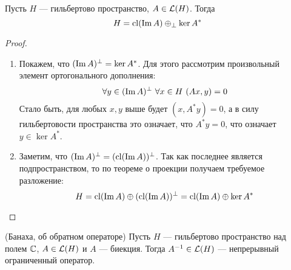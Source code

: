 \begin{theorem} \label{conj_decomp_th}
	Пусть $H$ --- гильбертово пространство, $A \in \mathcal{L}(H)$. Тогда
	\[
		H = \operatorname{cl}(\operatorname{Im} A) \oplus_\bot \ker A^*
	\]
\end{theorem}

\begin{proof}~
	\begin{enumerate}
		\item Покажем, что $(\operatorname{Im} A)^\bot = \ker A^*$. Для этого рассмотрим произвольный элемент ортогонального дополнения:
		\[
			\forall y \in (\im A)^\bot\ \forall x \in H\ (Ax, y) = 0
		\]
		Стало быть, для любых $x, y$ выше будет $(x, A^*y) = 0$, а в силу гильбертовости пространства это означает, что $A^*y = 0$, что означает $y \in \ker A^*$.
		
		\item Заметим, что $(\operatorname{Im} A)^\bot = (\operatorname{cl}(\operatorname{Im} A))^\bot$. Так как последнее является подпространством, то по теореме о проекции получаем требуемое разложение:
		\[
			H = \operatorname{cl}(\operatorname{Im} A) \oplus (\operatorname{cl}(\operatorname{Im} A))^\bot = \operatorname{cl}(\operatorname{Im} A) \oplus \ker A^*
		\]
	\end{enumerate}
\end{proof}

\begin{theorem} (Банаха, об обратном операторе)
	Пусть $H$ --- гильбертово пространство над полем $\mathbb{C}$, $A \in \mathcal{L}(H)$ и $A$ --- биекция. Тогда $A^{-1} \in \mathcal{L}(H)$ --- непрерывный ограниченный оператор.
\end{theorem}

